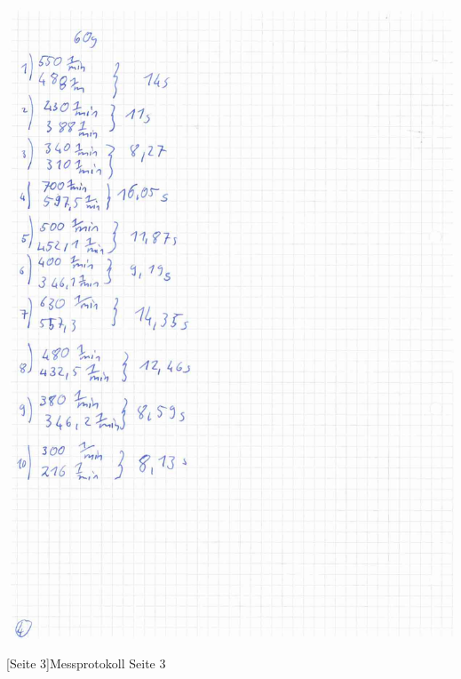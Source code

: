 \documentclass[12pt,a4paper,]{scrreprt}
\begin{document}
        \begin{center}
   		 	\includegraphics[scale=0.32]{3.jpg}
   	 	\end{center}
    	[Seite 3]{Messprotokoll Seite 3}
    	\pagebreak
    	
\end{document}
